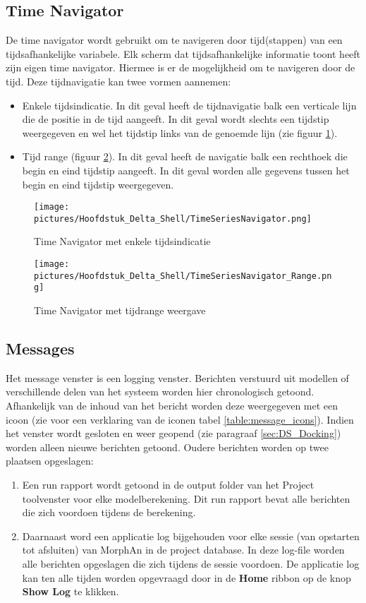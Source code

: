 \subsection{Time Navigator}
	\label{sec:TimeSeriesNavigator}
De time navigator wordt gebruikt om te navigeren door tijd(stappen) van een tijdsafhankelijke variabele. Elk scherm dat tijdsafhankelijke informatie toont heeft zijn eigen time navigator. Hiermee is er de mogelijkheid om te navigeren door de tijd. Deze tijdnavigatie kan twee vormen aannemen:
\begin{itemize}
\item Enkele tijdsindicatie. In dit geval heeft de tijdnavigatie balk een verticale lijn die de positie in de tijd aangeeft. In dit geval wordt slechts een tijdstip weergegeven en wel het tijdstip links van de genoemde lijn (zie figuur \ref{fig:TimeSeriesNavigator}). 
\item Tijd range (figuur \ref{fig:TimeSeriesNavigator_Range}). In dit geval heeft de navigatie balk een rechthoek die begin en eind tijdstip aangeeft. In dit geval worden alle gegevens tussen het begin en eind tijdstip weergegeven.
\end{itemize}

\begin{figure}[H]
	\centering
		\texttt{[image: pictures/Hoofdstuk\_Delta\_Shell/TimeSeriesNavigator.png]}
		\caption{Time Navigator met enkele tijdsindicatie}
	\label{fig:TimeSeriesNavigator}
\end{figure}
\begin{figure}[H]
	\centering
		\texttt{[image: pictures/Hoofdstuk\_Delta\_Shell/TimeSeriesNavigator\_Range.png]}
		\caption{Time Navigator met tijdrange weergave}
	\label{fig:TimeSeriesNavigator_Range}
\end{figure}

\subsection{Messages}
	\label{sec:DS_Messages}
Het message venster is een logging venster. Berichten verstuurd uit modellen of verschillende delen van het systeem worden hier chronologisch getoond. Afhankelijk van de inhoud van het bericht worden deze weergegeven met een icoon (zie voor een verklaring van de iconen tabel \ref{table:message_icons}). Indien het venster wordt gesloten en weer geopend (zie paragraaf \ref{sec:DS_Docking}) worden alleen nieuwe berichten getoond. Oudere berichten worden op twee plaatsen opgeslagen:
\begin{enumerate}
\item Een run rapport wordt getoond in de output folder van het Project toolvenster voor elke modelberekening. Dit run rapport bevat alle berichten die zich voordoen tijdens de berekening.
\item Daarnaast word een applicatie log bijgehouden voor elke sessie (van opstarten tot afsluiten) van MorphAn in de project database. In deze log-file worden alle berichten opgeslagen die zich tijdens de sessie voordoen. De applicatie log kan ten alle tijden worden opgevraagd door in de \textbf{Home} ribbon op de knop \textbf{Show Log} te klikken.
\end{enumerate}

